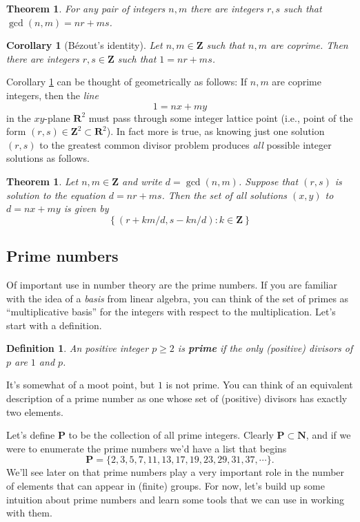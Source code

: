 \documentclass[12pt]{article}
\numberwithin{equation}{subsection}
\newtheorem{thm}[subsection]{Theorem}
\newtheorem{defn}[subsection]{Definition}
\newtheorem{corollary}[subsection]{Corollary}
\theoremstyle{note}
\begin{document}
\begin{thm}\label{gcd-exists}
	For any pair of integers $n,m$ there are integers $r,s$ such that $\gcd(n,m)=nr+ms$.
\end{thm}

\begin{corollary}[B\'ezout's identity] \label{bez}
	Let $n,m\in\mathbf{Z}$ such that $n,m$ are coprime. Then there are integers $r,s\in\mathbf{Z}$ such that $1=nr+ms$. 
\end{corollary}

Corollary \ref{bez} can be thought of geometrically as follows: If $n,m$ are coprime integers, then the \textit{line} \[1=nx+my\] in the $xy$-plane $\mathbf{R}^2$ must pass through some integer lattice point (i.e., point of the form $(r,s)\in\mathbf{Z}^2\subset \mathbf{R}^2$). In fact more is true, as knowing just one solution $(r,s)$ to the greatest common divisor problem produces \textit{all} possible integer solutions as follows.

\begin{thm} \label{gcd-solutions}
	Let $n,m\in\mathbf{Z}$ and write $d=\gcd(n,m)$. Suppose that $(r,s)$ is solution to the equation $d=nr+ms$. Then the set of all solutions $(x,y)$ to $d=nx+my$ is given by \[ \left\{ (r+km/d,s-kn/d) : k\in\mathbf{Z}\right\} \] 
\end{thm}

\subsection{Prime numbers}
Of important use in number theory are the prime numbers. If you are familiar with the idea of a \textit{basis} from linear algebra, you can think of the set of primes as ``multiplicative basis'' for the integers with respect to the multiplication. Let's start with a definition.


\begin{defn}
	An positive integer $p\geq 2$ is \textbf{prime} if the only (positive) divisors of $p$ are $1$ and $p$. \end{defn}
It's somewhat of a moot point, but $1$ is not prime. You can think of an equivalent description of a prime number as one whose set of (positive) divisors has exactly two elements. 

Let's define $\mathbf{P}$ to be the collection of all prime integers. Clearly $\mathbf{P}\subset \mathbf{N}$, and if we were to enumerate the prime numbers we'd have a list that begins \[ \mathbf{P}=\{ 2,3,5,7,11,13,17,19,23,29,31,37,\cdots \}. \]
We'll see later on that prime numbers play a very important role in the number of elements that can appear in (finite) groups. For now, let's build up some intuition about prime numbers and learn some tools that we can use in working with them. 
\end{document}

